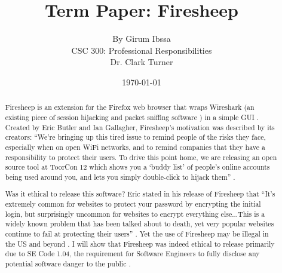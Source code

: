 \documentclass[11pt]{article}
\begin{document}
\title{\vfill Term Paper: Firesheep} %
\author{
By Girum Ibssa\vspace{10pt} \\
CSC 300: Professional Responsibilities\vspace{10pt} \\
Dr. Clark Turner\vspace{10pt} \\
}
\date{\today}

\maketitle

\vfill  %
\begin{abstract}
Firesheep is an extension for the Firefox web browser that wraps Wireshark (an existing piece of session hijacking and packet sniffing software \cite{wireshark}) in a simple GUI \cite{firesheep-source}. Created by Eric Butler and Ian Gallagher, Firesheep's motivation was described by its creators: ``We're bringing up this tired issue to remind people of the risks they face, especially when on open WiFi networks, and to remind companies that they have a responsibility to protect their users. To drive this point home, we are releasing an open source tool at ToorCon 12 which shows you a `buddy list' of people's online accounts being used around you, and lets you simply double-click to hijack them'' \cite{security-now}.

Was it ethical to release this software? Eric stated in his release of Firesheep that ``It's extremely common for websites to protect your password by encrypting the initial login, but surprisingly uncommon for websites to encrypt everything else...This is a widely known problem that has been talked about to death, yet very popular websites continue to fail at protecting their users'' \cite{eric-butler}. Yet the use of Firesheep may be illegal in the US and beyond \cite{illegal-to-use-firesheep}. I will show that Firesheep was indeed ethical to release primarily due to SE Code 1.04, the requirement for Software Engineers to fully disclose any potential software danger to the public \cite{se-code}.

\end{abstract}
\end{document}
